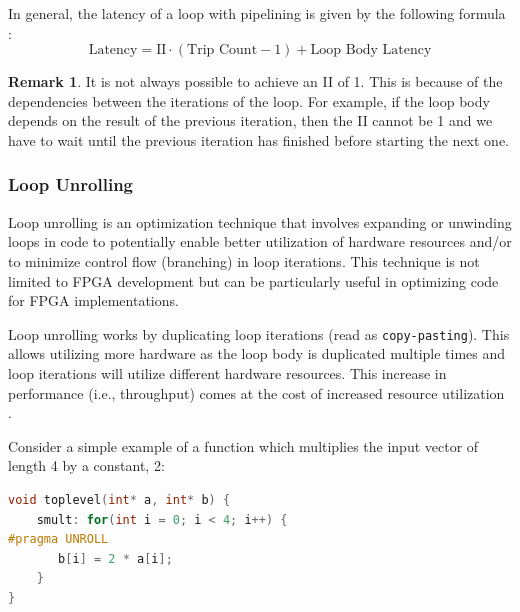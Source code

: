 \documentclass[a4paper, twoside]{report}
\theoremstyle{definition}
\newtheorem{remark}[theorem]{Remark}
\numberwithin{equation}{section}
\begin{document}
In general, the latency of a loop with pipelining is given by the following formula \cite{intelpipelineloopsII}:
\begin{equation}
    \text{Latency} = \text{II} \cdot (\text{Trip Count} - 1) + \text{Loop Body Latency}
\end{equation}



\begin{remark}
    It is not always possible to achieve an II of 1.
    This is because of the dependencies between the iterations of the loop.
    For example, if the loop body depends on the result of the previous iteration,
    then the II cannot be 1 and we have to wait until the previous iteration has finished
    before starting the next one.
\end{remark}



\subsubsection{Loop Unrolling}

Loop unrolling is an optimization technique that involves expanding or unwinding
loops in code to potentially enable better utilization of hardware resources and/or
to minimize control flow (branching) in loop iterations.
This technique is not limited to FPGA development but can be particularly useful
in optimizing code for FPGA implementations.

Loop unrolling works by duplicating loop iterations (read as \texttt{copy-pasting}).
This allows utilizing more hardware as the loop body is duplicated multiple times
and loop iterations will utilize different hardware resources.
This increase in performance (i.e., throughput) comes at the cost of increased
resource utilization \cite{AMD2023Pipelining}.

Consider a simple example of a function which multiplies the
input vector of length 4 by a constant, 2:
\begin{lstlisting}[language=c++,numbers=none]
void toplevel(int* a, int* b) {
	smult: for(int i = 0; i < 4; i++) {
#pragma UNROLL
	   b[i] = 2 * a[i];
	}
}
\end{lstlisting}
\end{document}

